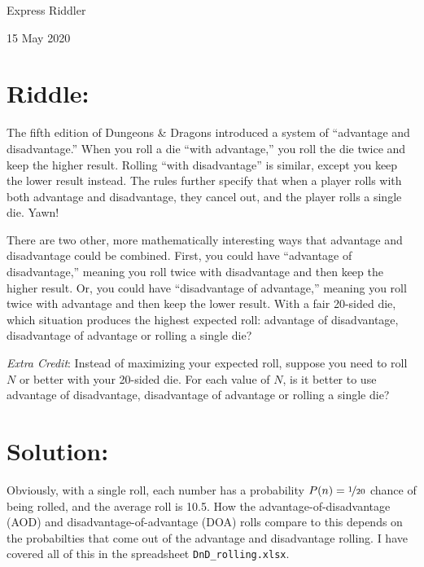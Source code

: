 \documentclass{article}
\begin{document}
\pagestyle{empty} %

\begin{center}
{\LARGE Express Riddler}

\vspace{0.15in}

{\Large 15 May 2020}
\end{center}


\section*{Riddle:}

The fifth edition of Dungeons \& Dragons introduced a system of ``advantage and disadvantage.''
When you roll a die ``with advantage,'' you roll the die twice and keep the higher result.
Rolling ``with disadvantage'' is similar, except you keep the lower result instead.
The rules further specify that when a player rolls with both advantage and disadvantage, they cancel out, and the player rolls a single die.
Yawn!

There are two other, more mathematically interesting ways that advantage and disadvantage could be combined.
First, you could have ``advantage of disadvantage,'' meaning you roll twice with disadvantage and then keep the higher result.
Or, you could have ``disadvantage of advantage,'' meaning you roll twice with advantage and then keep the lower result.
With a fair 20-sided die, which situation produces the highest expected roll: advantage of disadvantage, disadvantage of advantage or rolling a single die?

\textit{Extra Credit}: Instead of maximizing your expected roll, suppose you need to roll $N$ or better with your 20-sided die.
For each value of $N$, is it better to use advantage of disadvantage, disadvantage of advantage or rolling a single die?

\section*{Solution:}

Obviously, with a single roll, each number has a probability $P(n)=\nicefrac{1}{20}$ chance of being rolled, and the average roll is 10.5.
How the advantage-of-disadvantage (AOD) and disadvantage-of-advantage (DOA) rolls compare to this depends on the probabilties that come out of the advantage and disadvantage rolling.
I have covered all of this in the spreadsheet \texttt{DnD\_rolling.xlsx}.
\end{document}
